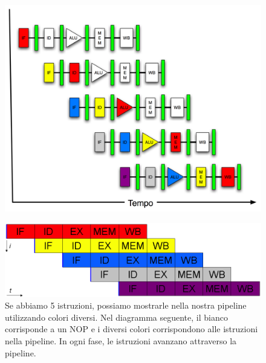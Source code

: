 \begin{frame}
		
		\begin{figure}[htbp]
		    \centering
		    \begin{minipage}{0.49\textwidth}
		        \centering
		        \includegraphics[width=1.0\linewidth]{images/7_pipeline/pipeline_in_time.png}
		        \label{fig:pipeline_pipeline_in_time}
		    \end{minipage}
		    \hfill
		    \begin{minipage}{0.49\textwidth}
		        \centering 
				\includegraphics[width=1.0\linewidth]{images/7_pipeline/pipeline_five_stages.png}
		    \end{minipage}
		    \caption{Se abbiamo 5 istruzioni, possiamo mostrarle nella nostra pipeline utilizzando colori diversi. Nel diagramma seguente, il bianco corrisponde a un NOP e i diversi colori corrispondono alle istruzioni nella pipeline. In ogni fase, le istruzioni avanzano attraverso la pipeline.}
		    \label{fig:pipeline_pipeline_in_time}
		\end{figure}
		

\end{frame}



